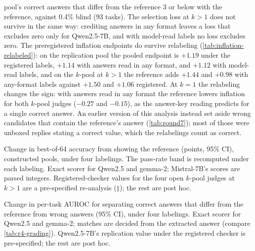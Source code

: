 pool's correct answers that differ from the reference 3 or below with the reference, against 0.4\%
blind (93 tasks).\pre{} The selection loss at $k{>}1$ does not survive in the same way: crediting answers in any format leaves a loss that excludes zero only for Qwen2.5-7B, and with model-read labels no loss excludes zero. The preregistered inflation endpoints do survive relabeling (\cref{tab:inflation-relabeled}): on the replication pool the pooled endpoint is $+1.19$ under the registered labels, $+1.14$ with answers read in any format, and $+1.12$ with model-read labels, and on the $k$-pool at $k{>}1$ the reference adds $+1.44$ and $+0.98$ with any-format labels against $+1.50$ and $+1.06$ registered. At $k{=}1$ the relabeling changes the sign: with answers read in any format the reference lowers inflation for both $k$-pool judges ($-0.27$ and $-0.15$), as the answer-key reading predicts for a single correct answer. An earlier version of this analysis instead set aside wrong candidates that contain the reference's answer (\cref{tab:round7}); most of those were unboxed replies stating a correct value, which the relabelings count as correct.\ph

\begin{table}[htbp]
\centering
\caption{Change in best-of-64 accuracy from showing the reference (points, 95\% CI), constructed pools, under four labelings. The pass-rate band is recomputed under each labeling. Exact scorer for Qwen2.5 and gemma-2; Mistral-7B's scores are parsed integers. Registered-checker values for the four open $k$-pool judges at $k{>}1$ are a pre-specified re-analysis ($\ddagger$); the rest are post hoc.}
\label{tab:labelings-acc}
\footnotesize
\setlength{\tabcolsep}{3pt}
\begin{adjustbox}{max width=\linewidth}\end{adjustbox}
\end{table}

\begin{table}[htbp]
\centering
\caption{Change in per-task AUROC for separating correct answers that differ from the reference from wrong answers (95\% CI), under four labelings. Exact scorer for Qwen2.5 and gemma-2; matches are decided from the extracted answer (compare \cref{tab:r4-grading}). Qwen2.5-7B's replication value under the registered checker is pre-specified; the rest are post hoc.}
\label{tab:labelings-gnm}
\footnotesize
\setlength{\tabcolsep}{3pt}
\begin{adjustbox}{max width=\linewidth}\end{adjustbox}
\end{table}

